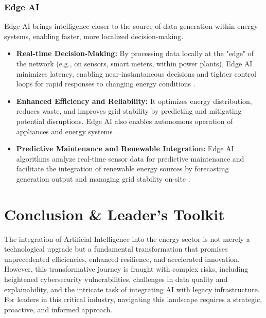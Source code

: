 \subsubsection{Edge AI}
Edge AI brings intelligence closer to the source of data generation within energy systems, enabling faster, more localized decision-making.
\begin{itemize}
    \item \textbf{Real-time Decision-Making:} By processing data locally at the "edge" of the network (e.g., on sensors, smart meters, within power plants), Edge AI minimizes latency, enabling near-instantaneous decisions and tighter control loops for rapid responses to changing energy conditions \cite{IIoTWorld_EdgeAI, Meegle_EdgeAI}.
    \item \textbf{Enhanced Efficiency and Reliability:} It optimizes energy distribution, reduces waste, and improves grid stability by predicting and mitigating potential disruptions. Edge AI also enables autonomous operation of appliances and energy systems \cite{SmartEnergy_EdgeAI, EdgeAITech_EdgeAI}.
    \item \textbf{Predictive Maintenance and Renewable Integration:} Edge AI algorithms analyze real-time sensor data for predictive maintenance and facilitate the integration of renewable energy sources by forecasting generation output and managing grid stability on-site \cite{EdgeAIHub_FutureTrends, SmartEnergy_EdgeAI}.
\end{itemize}

\section{Conclusion \& Leader's Toolkit}

The integration of Artificial Intelligence into the energy sector is not merely a technological upgrade but a fundamental transformation that promises unprecedented efficiencies, enhanced resilience, and accelerated innovation. However, this transformative journey is fraught with complex risks, including heightened cybersecurity vulnerabilities, challenges in data quality and explainability, and the intricate task of integrating AI with legacy infrastructure. For leaders in this critical industry, navigating this landscape requires a strategic, proactive, and informed approach.

